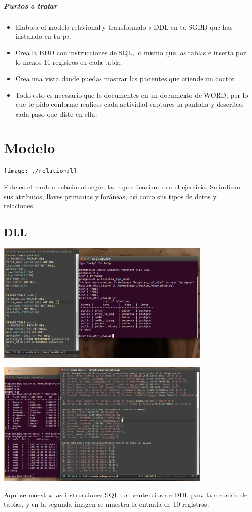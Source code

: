 \documentclass[spanish,12pt,letterpapper]{article}
\begin{document}
	\subparagraph{Puntos a tratar}
	\begin{itemize}
	\item Elabora el modelo relacional y transformalo a DDL en tu SGBD que has instalado en tu pc.
	\item Crea la BDD con instrucciones de SQL, lo mismo que las tablas e inserta por lo menos 10 registros en cada tabla.
	\item Crea una vista donde puedas mostrar los pacientes que atiende un doctor.
	\item Todo esto es necesario que lo documentes en un documento de WORD, por lo que te pido conforme realices cada actividad captures la pantalla y describas cada paso que diste en ella.
	\end{itemize}
	
	\section{Modelo}
	\begin{center}
	\texttt{[image: ./relational]}~\\[1cm]
	\end{center}
	Este es el modelo relacional según las especificaciones en el ejercicio. Se indican sus atributos, llaves primarias y foráneas, así como sus tipos de datos y relaciones.
	
	\subsection{DLL}
	\begin{center}
	\includegraphics[width=0.8\textwidth]{./tables}~\\[1cm]
	\end{center}
	\begin{center}
	\includegraphics[width=0.8\textwidth]{./entries}~\\[1cm]
	\end{center}
	Aquí se muestra las instrucciones SQL con sentencias de DDL para la creación de tablas, y en la segunda imagen se muestra la entrada de 10 registros.
	
\end{document}
